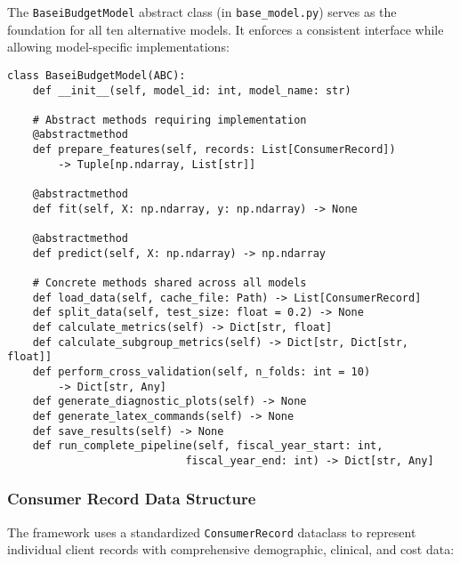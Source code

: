 The \texttt{BaseiBudgetModel} abstract class (in \texttt{base\_model.py}) serves as the foundation for all ten alternative models. It enforces a consistent interface while allowing model-specific implementations:

\begin{verbatim}
class BaseiBudgetModel(ABC):
    def __init__(self, model_id: int, model_name: str)
    
    # Abstract methods requiring implementation
    @abstractmethod
    def prepare_features(self, records: List[ConsumerRecord]) 
        -> Tuple[np.ndarray, List[str]]
    
    @abstractmethod
    def fit(self, X: np.ndarray, y: np.ndarray) -> None
    
    @abstractmethod
    def predict(self, X: np.ndarray) -> np.ndarray
    
    # Concrete methods shared across all models
    def load_data(self, cache_file: Path) -> List[ConsumerRecord]
    def split_data(self, test_size: float = 0.2) -> None
    def calculate_metrics(self) -> Dict[str, float]
    def calculate_subgroup_metrics(self) -> Dict[str, Dict[str, float]]
    def perform_cross_validation(self, n_folds: int = 10) 
        -> Dict[str, Any]
    def generate_diagnostic_plots(self) -> None
    def generate_latex_commands(self) -> None
    def save_results(self) -> None
    def run_complete_pipeline(self, fiscal_year_start: int, 
                            fiscal_year_end: int) -> Dict[str, Any]
\end{verbatim}

\subsubsection{Consumer Record Data Structure}

The framework uses a standardized \texttt{ConsumerRecord} dataclass to represent individual client records with comprehensive demographic, clinical, and cost data:

